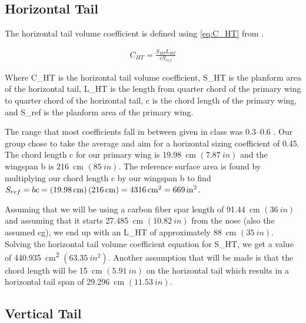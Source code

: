 \subsection{Horizontal Tail}

The horizontal tail volume coefficient is defined using \autoref{eq:C_HT} from \citet{grager2024}.

\begin{align}
    C_{HT} = \frac{S_{HT} L_{HT}}{c S_{ref}} \label{eq:C_HT}
\end{align}

\noindent{}Where \gls{C_HT} is the horizontal tail volume coefficient, \gls{S_HT} is the planform area of the horizontal tail, \gls{L_HT} is the length from quarter chord of the primary wing to quarter chord of the horizontal tail, \gls{c} is the chord length of the primary wing, and \gls{S_ref} is the planform area of the primary wing.

The range that most coefficients fall in between given in class was \numrange{0.3}{0.6} \citep{grager2024}. Our group chose to take the average and aim for a horizontal sizing coefficient of \num{0.45}. The chord length \gls{c} for our primary wing is \qty{19.98}{\centi\meter} $\left(\qty{7.87}{in}\right)$ and the wingspan \gls{b} is \qty{216}{\centi\meter} $\left(\qty{85}{in}\right)$. The reference surface area is found by multiplying our chord length \gls{c} by our wingspan \gls{b} to find $S_{ref} = bc = \left(\qty{19.98}{\centi\meter}\right)\left(\qty{216}{\centi\meter}\right) = \qty{4316}{\centi\meter\squared} = \qty{669}{in\squared}$.

Assuming that we will be using a carbon fiber spar length of \qty{91.44}{\centi\meter} $\left(\qty{36}{in}\right)$ and assuming that it starts \qty{27.485}{\centi\meter} $\left(\qty{10.82}{in}\right)$ from the nose (also the assumed \acrshort{cg}), we end up with an \gls{L_HT} of approximately \qty{88}{\centi\meter} $\left(\qty{35}{in}\right)$. Solving the horizontal tail volume coefficient equation for \gls{S_HT}, we get a value of \qty{440.935}{\centi\meter\squared} $\left(\qty{63.35}{in^2}\right)$. Another assumption that will be made is that the chord length will be \qty{15}{\centi\meter} $\left(\qty{5.91}{in}\right)$ on the horizontal tail which results in a horizontal tail span of \qty{29.296}{\centi\meter} $\left(\qty{11.53}{in}\right)$.

\subsection{Vertical Tail}

